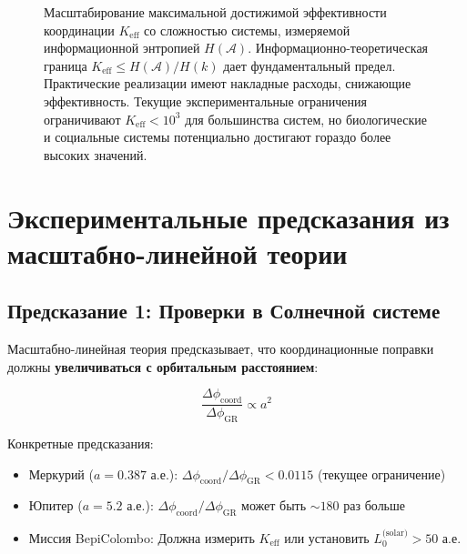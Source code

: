 \documentclass[11pt,a4paper]{article}
\begin{document}
\begin{figure}[htbp]
{
		}
		\caption{Масштабирование максимальной достижимой эффективности координации $K_{\mathrm{eff}}$ со сложностью системы, измеряемой информационной энтропией $H(\mathcal{A})$. Информационно-теоретическая граница $K_{\mathrm{eff}} \leq H(\mathcal{A})/H(k)$ дает фундаментальный предел. Практические реализации имеют накладные расходы, снижающие эффективность. Текущие экспериментальные ограничения ограничивают $K_{\mathrm{eff}} < 10^3$ для большинства систем, но биологические и социальные системы потенциально достигают гораздо более высоких значений.}
		\label{fig:keff-scaling}
	\end{figure}
	
	\section{Экспериментальные предсказания из масштабно-линейной теории}
	\label{sec:scale-predictions}
	
	\subsection{Предсказание 1: Проверки в Солнечной системе}
	
	Масштабно-линейная теория предсказывает, что координационные поправки должны 
	\textbf{увеличиваться с орбитальным расстоянием}:
	
	\begin{equation}
		\frac{\Delta\phi_{\text{coord}}}{\Delta\phi_{\text{GR}}} \propto a^2
	\end{equation}
	
	Конкретные предсказания:
	\begin{itemize}
		\item Меркурий ($a = 0.387$ а.е.): $\Delta\phi_{\text{coord}}/\Delta\phi_{\text{GR}} < 0.0115$ (текущее ограничение)
		\item Юпитер ($a = 5.2$ а.е.): $\Delta\phi_{\text{coord}}/\Delta\phi_{\text{GR}}$ может быть $\sim 180$ раз больше
		\item Миссия BepiColombo: Должна измерить $K_{\mathrm{eff}}$ или установить $L_0^{\text{(solar)}} > 50$ а.е.
	\end{itemize}
	
\end{document}
